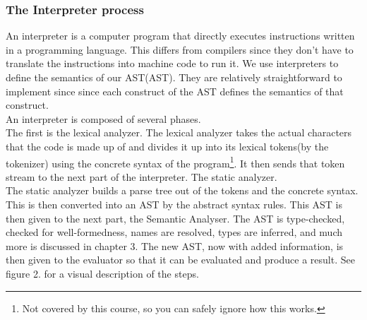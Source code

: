 \documentclass[tikz, border=5mm]{article}
\begin{document}
        \subsubsection{The Interpreter process}
            
            An \gls{interpreter} is a computer program that directly executes instructions written in a programming language.
            This differs from \glspl{compiler} since they don't have to translate the instructions into machine code to run it. 
            We use interpreters to define the semantics of our \gls{AST}(AST). They are relatively straightforward to implement since
            since each construct of the AST defines the semantics of that construct.\\
            \newline
            An interpreter is composed of several phases. \\
            The first is the lexical analyzer. The lexical analyzer takes the actual characters that the code is made up of and divides it up into its lexical tokens(by the tokenizer) using the concrete syntax of the program\footnote{Not covered by this course, so you can safely ignore how this works.}. 
            It then sends that token stream to the next part of the interpreter. The static analyzer.\\
            The static analyzer builds a parse tree out of the tokens and the concrete syntax. This is then converted into an AST by the abstract syntax rules. This AST is then given to the next part, the Semantic Analyser.
            The AST is type-checked, checked for well-formedness, names are resolved, types are inferred, and much more is discussed in chapter 3. The new AST, now with added information, is then given to the evaluator so that it can be evaluated and produce a result.
            See figure 2. for a visual description of the steps.
\end{document}
